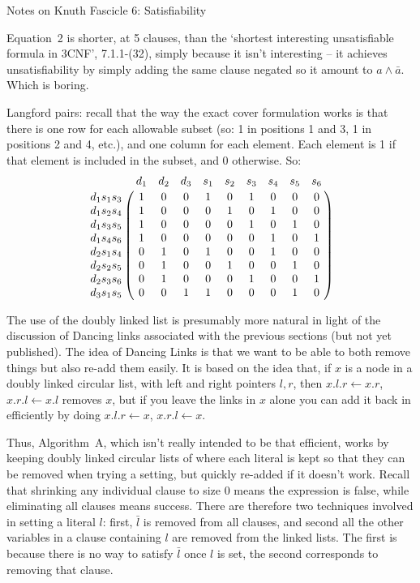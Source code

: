 \def\newstep#1{\smallskip \noindent {\bf #1}}

\topglue 0.5in
\centerline{Notes on Knuth Fascicle 6: Satisfiability}
\vskip 0.3in


\noindent [p 1] Equation~2 is shorter, at 5 clauses, than the `shortest
interesting unsatisfiable formula in 3CNF', 7.1.1-(32), simply because it isn't
interesting -- it achieves unsatisfiability by simply adding the
same clause negated so it amount to $a \wedge \bar a$.
Which is boring.

\vskip 0.1in 

\noindent [p. 5] Langford pairs: recall that the way the exact cover
formulation works is that there is one row for each allowable subset
(so: 1 in positions 1 and 3, 1 in positions 2 and 4, etc.), and one
column for each element.  Each element is 1 if that element
is included in the subset, and 0 otherwise.  So:
$$
 \bordermatrix{
  ~                   & d_1 & d_2 & d_3 & s_1 & s_2 & s_3 & s_4 & s_5 & s_6 \cr
   d_1 s_1 s_3 & 1    & 0     & 0     & 1     & 0     & 1     & 0     & 0     & 0    \cr
   d_1 s_2 s_4 & 1    & 0     & 0     & 0     & 1     & 0     & 1     & 0     & 0    \cr
   d_1 s_3 s_5 & 1    & 0     & 0     & 0     & 0     & 1     & 0     & 1     & 0    \cr
   d_1 s_4 s_6 & 1    & 0     & 0     & 0     & 0     & 0     & 1     & 0     & 1    \cr
   d_2 s_1 s_4 & 0    & 1     & 0     & 1     & 0     & 0     & 1     & 0     & 0    \cr
   d_2 s_2 s_5 & 0    & 1     & 0     & 0     & 1     & 0     & 0     & 1     & 0    \cr
   d_2 s_3 s_6 & 0    & 1     & 0     & 0     & 0     & 1     & 0     & 0     & 1    \cr
   d_3 s_1 s_5 & 0    & 0     & 1     & 1     & 0     & 0     & 0     & 1     & 0    \cr
 } 
$$

\vskip 0.1in 

\noindent [p28] The use of the doubly linked list is presumably more
natural in light of the discussion of Dancing links associated with the
previous sections (but not yet published).  The idea of Dancing Links
is that we want to be able to both remove things but also re-add them
easily.  It is based on the idea that, if $x$ is a node in a doubly
linked circular list, with left and right pointers $l, r$, then
$x.l.r \gets x.r$, $x.r.l \gets x.l$ removes $x$, but if you leave
the links in $x$ alone you can add it back in efficiently by doing
$x.l.r \gets x$, $x.r.l \gets x$.

Thus, Algorithm~A, which isn't really intended to be that efficient,
works by keeping doubly linked circular lists of where each literal
is kept so that they can be removed when trying a setting, but
quickly re-added if it doesn't work.  Recall that shrinking any individual
clause to size 0 means the expression is false, while eliminating
all clauses means success.  There are therefore two techniques involved
in setting a literal $l$: first, $\bar l$ is removed from all clauses, and
second all the other variables in a clause containing $l$ are removed
from the linked lists.  The first is because there is no way to satisfy
$\bar l$ once $l$ is set, the second corresponds to removing that clause.

